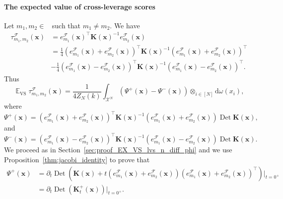 \documentclass[twoside,11pt]{book}
\numberwithin{theorem}{chapter}
\numberwithin{definition}{chapter}
\numberwithin{proposition}{chapter}
\numberwithin{corollary}{chapter}
\numberwithin{example}{chapter}
\numberwithin{lemma}{chapter}
\DeclareMathOperator{\Det}{Det}
\DeclareMathOperator{\VS}{\mathrm{VS}}
\DeclareMathOperator{\Tran}{\intercal}
\DeclareMathOperator{\EX}{\mathbb{E}}
\DeclareMathOperator{\F}{\mathcal{F}}
\DeclareMathOperator{\Ns}{\mathbb{N}^{*}}
\newcommand{\rb}[1]{\textcolor{magenta}{#1}}
\begin{document}
\paragraph{The expected value of cross-leverage scores}
Let $m_{1},m_{2} \in \Ns$ such that $m_{1} \neq m_{2}$. We have
\begin{align}
\tau_{m_{1},m_{2}}^{\F}(\bm{x}) & = e_{m_{1}}^{\mathcal{F}}(\bm{x})^{\Tran}\bm{K}(\bm{x})^{-1}e_{m_{2}}^{\mathcal{F}}(\bm{x}) \nonumber \\
& = \frac{1}{4} \left(e_{m_{1}}^{\mathcal{F}}(\bm{x}) + e_{m_{2}}^{\mathcal{F}}(\bm{x})\right)^{\Tran}\bm{K}(\bm{x})^{-1}\left(e_{m_{1}}^{\mathcal{F}}(\bm{x}) + e_{m_{2}}^{\mathcal{F}}(\bm{x})\right)^{\Tran}  \nonumber \\
& - \frac{1}{4} \left(e_{m_{1}}^{\mathcal{F}}(\bm{x}) - e_{m_{2}}^{\mathcal{F}}(\bm{x})\right)^{\Tran}\bm{K}(\bm{x})^{-1}\left(e_{m_{1}}^{\mathcal{F}}(\bm{x}) - e_{m_{2}}^{\mathcal{F}}(\bm{x})\right)^{\Tran}.
\end{align}
Thus
\begin{equation}
\EX_{\VS} \tau_{m_{1},m_{2}}^{\F}(\bm{x}) = \frac{1}{4 Z_{N}(k)}\int_{\mathcal{X}^{N}} \left( \Psi^{+}(\bm{x}) - \Psi^{-}(\bm{x}) \right) \otimes_{i \in [N]}\mathrm{d}\omega(x_{i}),
\end{equation}
where
\begin{equation}
\Psi^{+}(\bm{x}) = \left(e_{m_{1}}^{\mathcal{F}}(\bm{x})+e_{m_{2}}^{\mathcal{F}}(\bm{x})\right)^{\Tran}\bm{K}(\bm{x})^{-1}\left(e_{m_{1}}^{\mathcal{F}}(\bm{x})+e_{m_{2}}^{\mathcal{F}}(\bm{x})\right) \Det \bm{K}(\bm{x}),
\end{equation}
and
\begin{equation}
\Psi^{-}(\bm{x}) = \left(e_{m_{1}}^{\mathcal{F}}(\bm{x})-e_{m_{2}}^{\mathcal{F}}(\bm{x})\right)^{\Tran}\bm{K}(\bm{x})^{-1}\left(e_{m_{1}}^{\mathcal{F}}(\bm{x})-e_{m_{2}}^{\mathcal{F}}(\bm{x})\right) \Det \bm{K}(\bm{x}).
\end{equation}
We proceed as in Section~\ref{sec:proof_EX_VS_lvs_n_diff_phi} and we use Proposition~\ref{thm:jacobi_identity} to prove that
\begin{align}
\Psi^{+}(\bm{x}) & = \partial_{t} \Det \left(\bm{K}(\bm{x})+t \left(e_{m_{1}}^{\mathcal{F}}(\bm{x}) + e_{m_{2}}^{\mathcal{F}}(\bm{x}) \right)\left(e_{m_{1}}^{\mathcal{F}}(\bm{x}) + e_{m_{2}}^{\mathcal{F}}(\bm{x}) \right)^{\Tran}\right)|_{t = 0^{+}} \nonumber \\
& = \partial_{t} \Det \left(\bm{K}_{t}^{+}(\bm{x})\right)|_{t = 0^{+}}.
\end{align}
\end{document}
